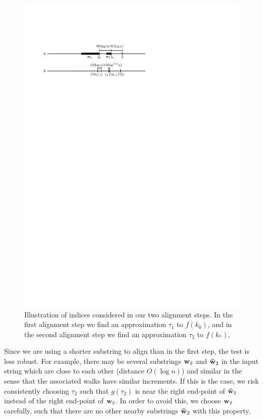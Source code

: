\documentclass[final,12pt]{colt2018} %
\newcommand{\1}{\mathbf{1}}
\newcommand{\wh}{\widehat}
\def\w{{\bf w}}
\begin{document}
\begin{figure}
	\centering
	\includegraphics[scale=1]{alignment-outline}
	\caption{Illustration of indices considered in our two alignment steps. In the first alignment step we find an approximation $\tau_1$ to $f(k_0)$, and in the second alignment step we find an approximation $\tau_2$ to $f(k_*)$.}
\end{figure}

Since we are using a shorter substring to align than in the first step, the test is less robust. For example, there may be several substrings $\w_2$ and $\wh\w_2$ in the input string which are close to each other (distance $O(\log n)$) and similar in the sense that the associated walks have similar increments. If this is the case, we risk consistently choosing $\tau_2$ such that $g(\tau_2)$ is near the right end-point of $\wh \w_2$ instead of the right end-point of $\w_2$. In order to avoid this, we choose $\w_2$ carefully, such that there are no other nearby substrings $\wh\w_2$ with this property.
\end{document}
